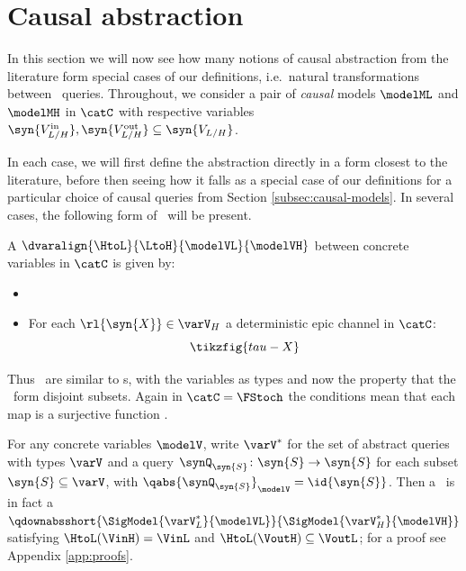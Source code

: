 \documentclass{article}
\begin{document}
\section{Causal abstraction} \label{sec:causal-abstraction}

In this section we will now see how many notions of causal abstraction from the literature form special cases of our definitions, i.e.~natural transformations between \ queries. Throughout, we consider a pair of \emph{causal} models $\modelML$ and $\modelMH$ in $\catC$ with respective variables $\syn{V^{\text{in}}_{L/H}},\syn{V^{\text{out}}_{L/H}} \subseteq \syn{V_{L/H}}$.


In each case, we will first define the abstraction directly in a form closest to the literature, before then seeing how it falls as a special case of our definitions for a particular choice of causal queries from Section \ref{subsec:causal-models}. In several cases, the following form of 
\ will be present. 


\begin{definition}[\rl{\varaligncaps}]
\cite[Def. 3.19]{BeckersEtAl_2019_AbstractingCausalModles} 
\cite[Def 31]{geiger2023causal}  
A \emph{\varalign} $\dvaralign{\HtoL}{\LtoH}{\modelVL}{\modelVH}$ 
between concrete variables in $\catC$ is given by:
\begin{itemize}
\item 
{}
\item 
For each $\rl{\syn{X}} \in \varV_H$ a deterministic epic channel in $\catC$:  
\[
\tikzfig{tau-X}
\] 
\end{itemize}
\end{definition}

Thus ~are similar to \typedown s, with the variables as types and now the property that the \ form disjoint subsets. Again in $\catC=\FStoch$ the conditions mean that each map is a surjective function . 

\begin{remark} \label{rem:var-alignment-ref} 
For any concrete variables $\modelV$, write $\varV^*$ for the set of abstract queries with types $\varV$ and a query $\synQ_\syn{S} \colon \syn{S} \to \syn{S}$ for each subset $\syn{S} \subseteq \varV$, with $\qabs{\synQ_\syn{S}}_\modelV = \id{\syn{S}}$. 
Then a \rl{\varalign\ $\dvaralign{\HtoL}{\LtoH}{\modelVL}{\modelVH}$ }\ is in fact a \qdown{} 
$\qdownabsshort{\SigModel{\varV^*_L}{\modelVL}}{\SigModel{\varV^*_H}{\modelVH}}$ satisfying $\HtoL(\VinH) = \VinL$ and $\HtoL(\VoutH) \subseteq \VoutL$; for a proof see Appendix \ref{app:proofs}. 
\end{remark}
\end{document}
